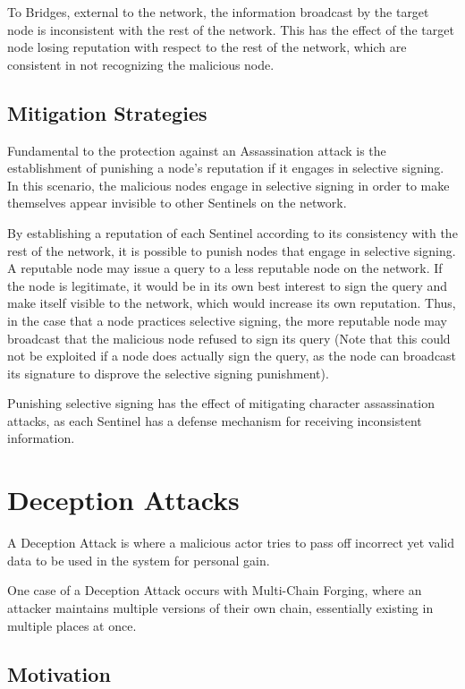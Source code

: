 \documentclass{article}
\begin{document}
To Bridges, external to the network, the information broadcast by the target node is inconsistent with the rest of the network. This has the effect of the target node losing reputation with respect to the rest of the network, which are consistent in not recognizing the malicious node.

\subsection{Mitigation Strategies}

Fundamental to the protection against an Assassination attack is the establishment of punishing a node's reputation if it engages in selective signing. In this scenario, the malicious nodes engage in selective signing in order to make themselves appear invisible to other Sentinels on the network.

By establishing a reputation of each Sentinel according to its consistency with the rest of the network, it is possible to punish nodes that engage in selective signing. A reputable node may issue a query to a less reputable node on the network. If the node is legitimate, it would be in its own best interest to sign the query and make itself visible to the network, which would increase its own reputation. Thus, in the case that a node practices selective signing, the more reputable node may broadcast that the malicious node refused to sign its query (Note that this could not be exploited if a node does actually sign the query, as the node can broadcast its signature to disprove the selective signing punishment).

Punishing selective signing has the effect of mitigating character assassination attacks, as each Sentinel has a defense mechanism for receiving inconsistent information.

\section{Deception Attacks}
A Deception Attack is where a malicious actor tries to pass off incorrect yet valid data to be used in the system for personal gain.

One case of a Deception Attack occurs with Multi-Chain Forging, where an attacker maintains multiple versions of their own chain, essentially existing in multiple places at once.

\subsection{Motivation}
\end{document}
